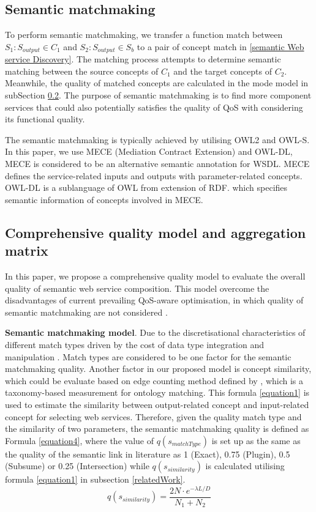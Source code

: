 \documentclass{llncs}
\begin{document}
\subsection{Semantic matchmaking} \label{semantic_matchmaking}
To perform semantic matchmaking, we transfer a function match between $S_{1}: S_{output} \in C_{1}$ and $S_{2}:S_{output} \in S_{b}$ to a pair of concept match in \ref{semantic Web service Discovery}. The matching process attempts to determine semantic matching between the source concepts of $C_{1}$ and the target concepts of $C_{2}$. Meanwhile, the quality of matched concepts are calculated in the mode model in subSection \ref{qualityModel}. The purpose of semantic matchmaking is to find more component services that could also potentially satisfies the quality of QoS with considering its functional quality.

The semantic matchmaking is typically achieved by utilising OWL2 and OWL-S. In this paper, we use MECE (Mediation Contract Extension) \cite{bleul2008self} and OWL-DL, MECE is considered to be an alternative semantic annotation for WSDL. MECE defines the service-related inputs and outputs with parameter-related concepts. OWL-DL is a sublanguage of OWL from extension of RDF. which specifies semantic information of concepts involved in MECE. 

\subsection{Comprehensive quality model and aggregation matrix}\label{qualityModel}
In this paper, we propose a comprehensive quality model to evaluate the overall quality of semantic web service composition. This model overcome the disadvantages of current prevailing QoS-aware optimisation, in which quality of semantic matchmaking are not considered \cite{bansal2016generalized,mier2015integrated,da2016particle,da2015graphevol,yu2013adaptive}.

\textbf{Semantic matchmaking model}. Due to the discretisational characteristics of different match types driven by the cost of  data type integration and manipulation \cite{lecue2009optimizing}. Match types are considered to be one factor for the semantic matchmaking quality. Another factor in our proposed model is concept similarity, which could be evaluate based on edge counting method defined by \cite{shet2012new}, which is a taxonomy-based measurement for ontology matching. This formula \ref{equation1} is used to estimate the similarity between output-related concept and input-related concept for selecting web services. Therefore, given the quality match type and the similarity of two parameters, the semantic matchmaking quality is defined as Formula \ref{equation4}, where the value of $q(s_ {matchType})$ is set up as the same as the quality of the semantic link in literature \cite{lecue2009optimizing} as 1 (Exact), 0.75 (Plugin), 0.5 (Subsume) or 0.25 (Intersection) while $q(s_ {similarity})$ is calculated utilising formula \ref{equation1} in subsection \ref{relatedWork}.
\begin{equation}
q(s_ {similarity}){=} \frac{2N \cdot e^{-\lambda L/D} }{N_{1}+N_{2}}
\label{equation1}
\end{equation}
\end{document}
